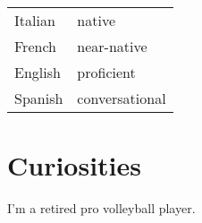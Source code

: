 \documentclass[]{plushcv}
\begin{document}
\begin{minipage}[t]{0.25\textwidth}
\begin{tabular}{ll}
Italian	     & native\\
French	     & near-native\\
English	     & proficient\\
Spanish      & conversational\\
\end{tabular}
\sectionsep


\section{Curiosities}
I'm a retired pro volleyball player.






\end{minipage} 
\end{document}
